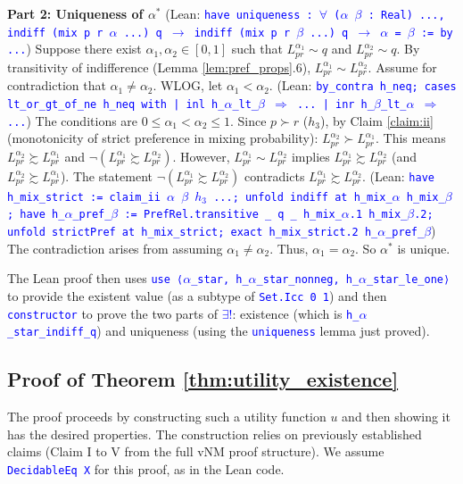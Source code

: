 \documentclass{article}
\theoremstyle{definition}
\newcommand{\tactic}[1]{\textcolor{blue}{\texttt{#1}}}
\newcommand{\pref}{\succsim} %
\newcommand{\strictpref}{\succ} %
\newcommand{\indiff}{\sim} %
\begin{document}
\textbf{Part 2: Uniqueness of $\alpha^*$}
(Lean: \tactic{have uniqueness : $\forall$ ($\alpha$ $\beta$ : Real) ..., indiff (mix p r $\alpha$ ...) q $\rightarrow$ indiff (mix p r $\beta$ ...) q $\rightarrow$ $\alpha$ = $\beta$ := by ...})
Suppose there exist $\alpha_1, \alpha_2 \in [0,1]$ such that $L_{pr}^{\alpha_1} \indiff q$ and $L_{pr}^{\alpha_2} \indiff q$.
By transitivity of indifference (Lemma \ref{lem:pref_props}.6), $L_{pr}^{\alpha_1} \indiff L_{pr}^{\alpha_2}$.
Assume for contradiction that $\alpha_1 \ne \alpha_2$. WLOG, let $\alpha_1 < \alpha_2$.
(Lean: \tactic{by\_contra h\_neq; cases lt\_or\_gt\_of\_ne h\_neq with | inl h\_$\alpha$\_lt\_$\beta$ $\Rightarrow$ ... | inr h\_$\beta$\_lt\_$\alpha$ $\Rightarrow$ ...})
The conditions are $0 \le \alpha_1 < \alpha_2 \le 1$.
Since $p \strictpref r$ ($h_3$), by Claim \ref{claim:ii} (monotonicity of strict preference in mixing probability):
$L_{pr}^{\alpha_2} \strictpref L_{pr}^{\alpha_1}$.
This means $L_{pr}^{\alpha_2} \pref L_{pr}^{\alpha_1}$ and $\lnot(L_{pr}^{\alpha_1} \pref L_{pr}^{\alpha_2})$.
However, $L_{pr}^{\alpha_1} \indiff L_{pr}^{\alpha_2}$ implies $L_{pr}^{\alpha_1} \pref L_{pr}^{\alpha_2}$ (and $L_{pr}^{\alpha_2} \pref L_{pr}^{\alpha_1}$).
The statement $\lnot(L_{pr}^{\alpha_1} \pref L_{pr}^{\alpha_2})$ contradicts $L_{pr}^{\alpha_1} \pref L_{pr}^{\alpha_2}$.
(Lean: \tactic{have h\_mix\_strict := claim\_ii $\alpha$ $\beta$ $h_3$ ...; unfold indiff at h\_mix\_$\alpha$ h\_mix\_$\beta$; have h\_$\alpha$\_pref\_$\beta$ := PrefRel.transitive \_ q \_ h\_mix\_$\alpha$.1 h\_mix\_$\beta$.2; unfold strictPref at h\_mix\_strict; exact h\_mix\_strict.2 h\_$\alpha$\_pref\_$\beta$})
The contradiction arises from assuming $\alpha_1 \ne \alpha_2$. Thus, $\alpha_1 = \alpha_2$.
So $\alpha^*$ is unique.

The Lean proof then uses \tactic{use ⟨$\alpha$\_star, h\_$\alpha$\_star\_nonneg, h\_$\alpha$\_star\_le\_one⟩} to provide the existent value (as a subtype of \tactic{Set.Icc 0 1}) and then \tactic{constructor} to prove the two parts of \tactic{$\exists!$}: existence (which is \tactic{h\_$\alpha$\_star\_indiff\_q}) and uniqueness (using the \tactic{uniqueness} lemma just proved).

\subsection{Proof of Theorem \ref{thm:utility_existence}}\label{proof:thm:utility_existence}
The proof proceeds by constructing such a utility function $u$ and then showing it has the desired properties. The construction relies on previously established claims (Claim I to V from the full vNM proof structure). We assume \tactic{DecidableEq X} for this proof, as in the Lean code.
\end{document}
